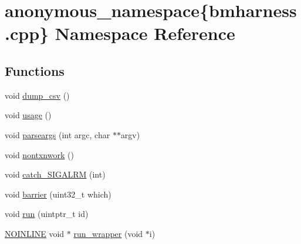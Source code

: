 \hypertarget{namespaceanonymous__namespace_02bmharness_8cpp_03}{\section{anonymous\-\_\-namespace\{bmharness.\-cpp\} Namespace Reference}
\label{namespaceanonymous__namespace_02bmharness_8cpp_03}
}
\subsection*{Functions}
\begin{DoxyCompactItemize}
\item 
void \hyperlink{namespaceanonymous__namespace_02bmharness_8cpp_03_a2a8d55c1ea2dc5801342821a8d01f224}{dump\-\_\-csv} ()
\item 
void \hyperlink{namespaceanonymous__namespace_02bmharness_8cpp_03_aa32e918fdf95644d2bde2bc98148180b}{usage} ()
\item 
void \hyperlink{namespaceanonymous__namespace_02bmharness_8cpp_03_ae311ed7903214e2716e5be5647da1147}{parseargs} (int argc, char $\ast$$\ast$argv)
\item 
void \hyperlink{namespaceanonymous__namespace_02bmharness_8cpp_03_a462b57784abacad16826f81937a24106}{nontxnwork} ()
\item 
void \hyperlink{namespaceanonymous__namespace_02bmharness_8cpp_03_a02bc3cad3eee0bfe5281b1a3a24cc784}{catch\-\_\-\-S\-I\-G\-A\-L\-R\-M} (int)
\item 
void \hyperlink{namespaceanonymous__namespace_02bmharness_8cpp_03_ac2f3da62721969da434141bf2282eab0}{barrier} (uint32\-\_\-t which)
\item 
void \hyperlink{namespaceanonymous__namespace_02bmharness_8cpp_03_a3a26cd6fa1dad4dd21a46c88c2a02817}{run} (uintptr\-\_\-t id)
\item 
\hyperlink{platform_8hpp_a1b173d22e57d9395897acbd8de62d505}{N\-O\-I\-N\-L\-I\-N\-E} void $\ast$ \hyperlink{namespaceanonymous__namespace_02bmharness_8cpp_03_a5275c4f9613d117686614bfbf705ab2b}{run\-\_\-wrapper} (void $\ast$i)
\end{DoxyCompactItemize}


